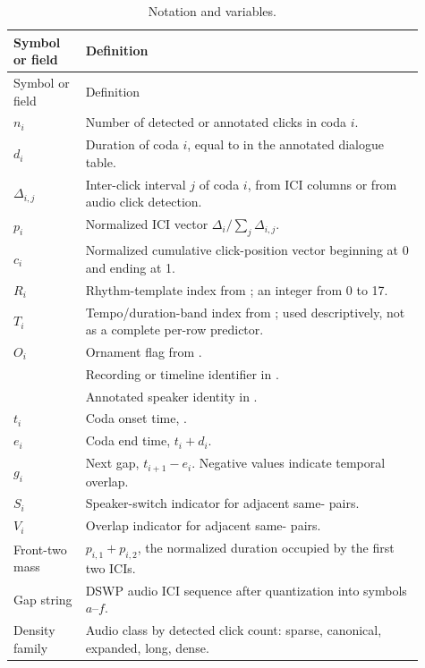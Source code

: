 \documentclass[11pt]{article}
\begin{document}
\begin{longtable}{P{0.16\linewidth}P{0.75\linewidth}}
\caption{Notation and variables.}\label{tab:variables}\\
\toprule
Symbol or field & Definition \\
\midrule
\endfirsthead
\toprule
Symbol or field & Definition \\
\midrule
\endhead
$n_i$ & Number of detected or annotated clicks in coda $i$. \\
$d_i$ & Duration of coda $i$, equal to  in the annotated dialogue table. \\
$\Delta_{i,j}$ & Inter-click interval $j$ of coda $i$, from ICI columns or from audio click detection. \\
$p_i$ & Normalized ICI vector $\Delta_i/\sum_j\Delta_{i,j}$. \\
$c_i$ & Normalized cumulative click-position vector beginning at 0 and ending at 1. \\
$R_i$ & Rhythm-template index from ; an integer from 0 to 17. \\
$T_i$ & Tempo/duration-band index from ; used descriptively, not as a complete per-row predictor. \\
$O_i$ & Ornament flag from . \\
 & Recording or timeline identifier in . \\
 & Annotated speaker identity in . \\
$t_i$ & Coda onset time, . \\
$e_i$ & Coda end time, $t_i+d_i$. \\
$g_i$ & Next gap, $t_{i+1}-e_i$. Negative values indicate temporal overlap. \\
$S_i$ & Speaker-switch indicator for adjacent same- pairs. \\
$V_i$ & Overlap indicator for adjacent same- pairs. \\
Front-two mass & $p_{i,1}+p_{i,2}$, the normalized duration occupied by the first two ICIs. \\
Gap string & DSWP audio ICI sequence after quantization into symbols $a$--$f$. \\
Density family & Audio class by detected click count: sparse, canonical, expanded, long, dense. \\
\bottomrule
\end{longtable}
\end{document}
